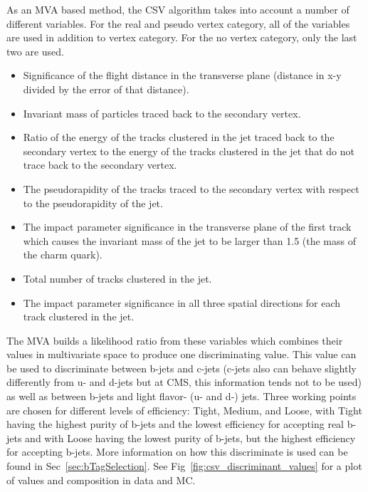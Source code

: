 	As an MVA based method, the CSV algorithm takes into account a number of different variables. For the real and pseudo vertex category, all of the variables are used in addition to vertex category. For the no vertex category, only the last two are used.
	\begin{itemize}
	\item Significance of the flight distance in the transverse plane (distance in x-y divided by the error of that distance).
	\item Invariant mass of particles traced back to the secondary vertex.
	\item Ratio of the energy of the tracks clustered in the jet traced back to the secondary vertex to the energy of the tracks clustered in the jet that do not trace back to the secondary vertex.
	\item The pseudorapidity of the tracks traced to the secondary vertex with respect to the pseudorapidity of the jet.
	\item The impact parameter significance in the transverse plane of the first track which causes the invariant mass of the jet to be larger than 1.5 \GeVcc (the mass of the charm quark).
	\item Total number of tracks clustered in the jet.
	\item The impact parameter significance in all three spatial directions for each track clustered in the jet.
	\end{itemize}
	
	The MVA builds a likelihood ratio from these variables which combines their values in multivariate space to produce one discriminating value. This value can be used to discriminate between b-jets and c-jets (c-jets also can behave slightly differently from u- and d-jets but at CMS, this information tends not to be used) as well as between b-jets and light flavor- (u- and d-) jets. Three working points are chosen for different levels of efficiency: Tight, Medium, and Loose, with Tight having the highest purity of b-jets and the lowest efficiency for accepting real b-jets and with Loose having the lowest purity of b-jets, but the highest efficiency for accepting b-jets. More information on how this discriminate is used can be found in Sec~\ref{sec:bTagSelection}. See Fig~\ref{fig:csv_discriminant_values} for a plot of values and composition in data and MC.
	
